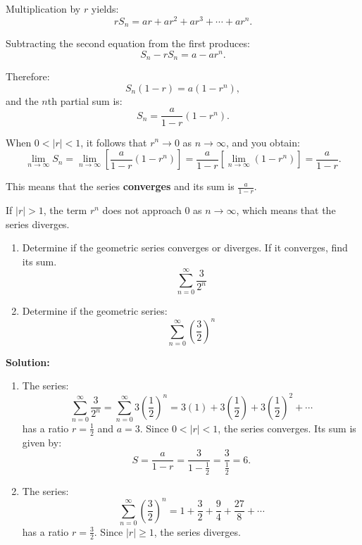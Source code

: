 \documentclass[12pt]{article}
\theoremstyle{beautifulthm}
\begin{document}
Multiplication by $r$ yields:
\[
rS_n = ar + ar^2 + ar^3 + \cdots + ar^n.
\]

Subtracting the second equation from the first produces:
\[
S_n - rS_n = a - ar^n.
\]

Therefore:
\[
S_n(1 - r) = a(1 - r^n),
\]
and the $n$th partial sum is:
\[
S_n = \frac{a}{1 - r}(1 - r^n).
\]

When $0 < \lvert r \rvert < 1$, it follows that $r^n \to 0$ as $n \to \infty$, and you obtain:
\[
\lim_{n \to \infty} S_n = \lim_{n \to \infty} \left[\frac{a}{1 - r}(1 - r^n)\right] = \frac{a}{1 - r} \left[\lim_{n \to \infty}(1 - r^n)\right] = \frac{a}{1 - r}.
\]

This means that the series \textbf{converges} and its sum is $\frac{a}{1 - r}$. 

If $\lvert r \rvert > 1$, the term $r^n$ does not approach $0$ as $n \to \infty$, which means that the series diverges.

\begin{tcolorbox}[colback=examplebg, colframe=red!75!black, title=\textbf{EXAMPLE 1: Convergent and Divergent Geometric Series}, fonttitle=\bfseries, sharp corners]

\begin{enumerate}
    \item Determine if the geometric series     converges or diverges. If it converges, find its sum.
    \[
    \sum_{n=0}^\infty \frac{3}{2^n}
    \]


    \item Determine if the geometric series:
    \[
    \sum_{n=0}^\infty \left(\frac{3}{2}\right)^n
    \]
   
\end{enumerate}

\tcblower
\textbf{Solution:} 
\begin{enumerate}
    \item The series:
    \[
    \sum_{n=0}^\infty \frac{3}{2^n} = \sum_{n=0}^\infty 3\left(\frac{1}{2}\right)^n = 3(1) + 3\left(\frac{1}{2}\right) + 3\left(\frac{1}{2}\right)^2 + \cdots
    \]
    has a ratio $r = \frac{1}{2}$ and $a = 3$. Since $0 < \lvert r \rvert < 1$, the series converges. Its sum is given by:
    \[
    S = \frac{a}{1 - r} = \frac{3}{1 - \frac{1}{2}} = \frac{3}{\frac{1}{2}} = 6.
    \]

    \item The series:
    \[
    \sum_{n=0}^\infty \left(\frac{3}{2}\right)^n = 1 + \frac{3}{2} + \frac{9}{4} + \frac{27}{8} + \cdots
    \]
    has a ratio $r = \frac{3}{2}$. Since $\lvert r \rvert \geq 1$, the series diverges.
\end{enumerate}
\end{tcolorbox}
\end{document}
